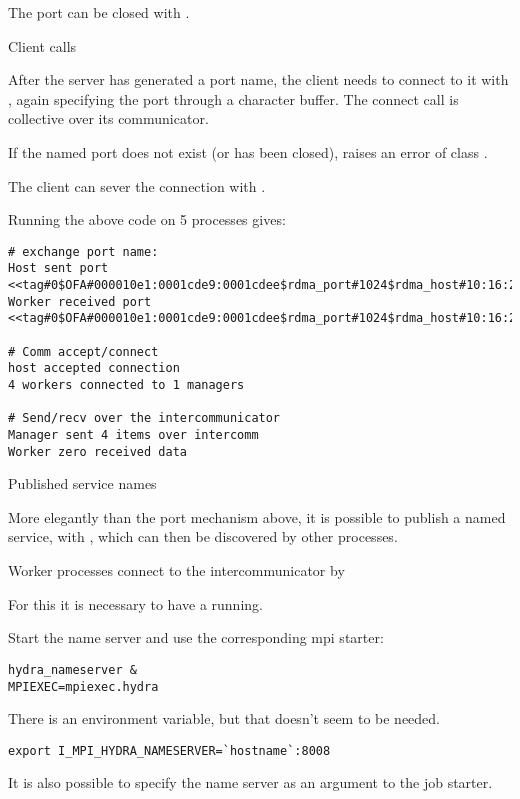 
The port can be closed with 
.

 {Client calls}

After the server has generated a port name, the client 
needs to connect to it with
, again specifying the port through a character buffer.
The connect call is collective over its communicator.


If the named port does not exist (or has been closed),
 raises an error of class .

The client can sever the connection with
.

Running the above code on 5 processes gives:
\begin{small}%
\begin{verbatim}
# exchange port name:
Host sent port <<tag#0$OFA#000010e1:0001cde9:0001cdee$rdma_port#1024$rdma_host#10:16:225:0:1:205:199:254:128:0:0:0:0:0:0$>>
Worker received port <<tag#0$OFA#000010e1:0001cde9:0001cdee$rdma_port#1024$rdma_host#10:16:225:0:1:205:199:254:128:0:0:0:0:0:0$>>

# Comm accept/connect
host accepted connection
4 workers connected to 1 managers

# Send/recv over the intercommunicator
Manager sent 4 items over intercomm
Worker zero received data  
\end{verbatim}
\end{small}%

 {Published service names}
\label{sec:mpi-publish}

More elegantly than the port mechanism above,
it is possible to publish a named service, 
with ,
which can then be discovered by other processes.


Worker processes connect to the intercommunicator by


For this it is necessary to have a  running.

\begin{intelnote}
Start the  name server and use the corresponding mpi starter:
\begin{verbatim}
hydra_nameserver &
MPIEXEC=mpiexec.hydra
\end{verbatim}
There is an environment variable, but that doesn't seem to be needed.
\begin{verbatim}
export I_MPI_HYDRA_NAMESERVER=`hostname`:8008
\end{verbatim}
It is also possible to specify the name server as an argument to the job starter.
\end{intelnote}

